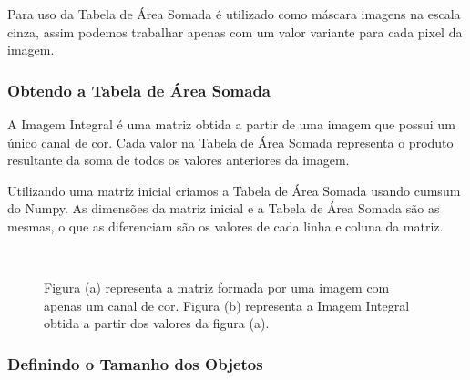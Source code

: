 \documentclass[12pt]{article}
\begin{document}
Para uso da Tabela de Área Somada é utilizado como máscara imagens na escala cinza, assim podemos trabalhar apenas com um valor variante para cada pixel da imagem.

\subsubsection{Obtendo a Tabela de Área Somada}

A Imagem Integral é uma matriz obtida a partir de uma imagem que possui um único canal de cor. Cada valor na Tabela de Área Somada representa o produto resultante da soma de todos os valores anteriores da imagem.

Utilizando uma matriz inicial criamos a Tabela de Área Somada usando cumsum do Numpy. As dimensões da matriz inicial e a Tabela de Área Somada são as mesmas, o que as diferenciam são os valores de cada linha e coluna da matriz.

\begin{figure}[H]
\centering
\mbox{\quad
{}}
\caption{Figura (a) representa a matriz formada por uma imagem com apenas um canal de cor. Figura (b) representa a Imagem Integral obtida a partir dos valores da figura (a).}
\label{fig6}
\end{figure}

\subsubsection{Definindo o Tamanho dos Objetos}
\end{document}

